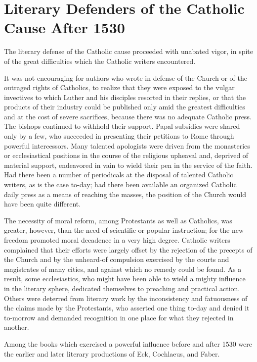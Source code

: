 \section{Literary Defenders of the Catholic Cause After 1530}

The literary defense of the Catholic cause proceeded with unabated
vigor, in spite of the great difficulties which the Catholic writers encountered.

It was not encouraging for authors who wrote in defense of the
Church or of the outraged rights of Catholics, to realize that they
were exposed to the vulgar invectives to which Luther and his disciples
resorted in their replies, or that the products of their industry
could be published only amid the greatest difficulties and at the cost
of severe sacrifices, because there was no adequate Catholic press. The
bishops continued to withhold their support. Papal subsidies were
shared only by a few, who succeeded in presenting their petitions to
Rome through powerful intercessors. Many talented apologists were
driven from the monasteries or ecclesiastical positions in the course of
the religious upheaval and, deprived of material support, endeavored
in vain to wield their pen in the service of the faith. Had there been
a number of periodicals at the disposal of talented Catholic writers, as
is the case to-day; had there been available an organized Catholic
daily press as a means of reaching the masses, the position of the
Church would have been quite different.

The necessity of moral reform, among Protestants as well as
Catholics, was greater, however, than the need of scientific or popular
instruction; for the new freedom promoted moral decadence in a
very high degree. Catholic writers complained that their efforts were
largely offset by the rejection of the precepts of the Church and by
the unheard-of compulsion exercised by the courts and magistrates of
many cities, and against which no remedy could be found. As a result,
some ecclesiastics, who might have been able to wield a mighty influence
in the literary sphere, dedicated themselves to preaching and
practical action. Others were deterred from literary work by the inconsistency
and fatuousness of the claims made by the Protestants,
who asserted one thing to-day and denied it to-morrow and demanded
recognition in one place for what they rejected in another.

Among the books which exercised a powerful influence before and
after 1530 were the earlier and later literary productions of Eck,
Cochlaeus, and Faber.

